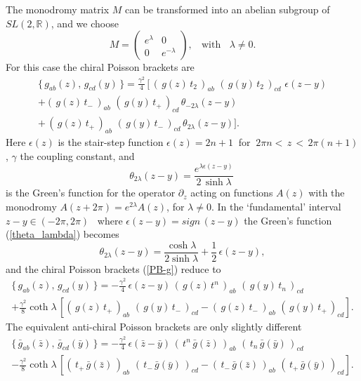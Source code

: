 \documentclass[a4paper,12pt]{article}
\newcommand{\rr}{\mathbb{R}}
\begin{document}
The monodromy matrix $M$ can be transformed into an abelian subgroup
\cite{Goddard}
of $SL(2,\rr)$, and we choose
\begin{equation}\label{monodromy-g1}
  M=\left( \begin{array}{cr}
  e^{\lambda} & 0\\ 0 & e^{-\lambda} \end{array}\right),
~~~~\mbox{with}~~~~\lambda \neq 0.
\end{equation}
For this case  the chiral
 Poisson brackets are \cite{JW}
\begin{eqnarray}\label{PB-lamda}
\label{PB-g}
\{\,g_{ab}(z),\, g_{cd}(y)\,\}=
\frac{\gamma^2}{4}\,[\,(\,g(z)\,t_2\,)_{ab}\,\,
(\,g(y)\,t_2\,)_{cd}\,\,\epsilon(z-y) \nonumber\\
+(\,g(z)\,t_-\,)_{ab}\,\,
(\,g(y)\,t_+\,)_{cd}\,
\theta_{-2\lambda} (z-y)\nonumber\\
+\, (\,g(z)\,t_+\,)_{ab}\,\,
(\,g(y)\,t_-\,)_{cd}\,
\theta_{2\lambda} (z-y)].
\end{eqnarray}
Here $\epsilon (z)$ is
the stair-step function $\epsilon (z)= 2n+1~$
for $~2\pi n <\,z\,<\, 2\pi (n+1)$,  $\gamma$  the coupling constant, and
\begin{equation}\label{theta_lambda}
\theta_{2\lambda} (z-y)=\frac{e^{\lambda \epsilon(z-y)}}{2\,\sinh\lambda}\,
\end{equation}
is the Green's function for the operator $\partial_z$ acting on
functions $A(z)$ with the monodromy $A(z+2\pi)=e^{2\lambda}A(z)$, for
$\lambda\neq 0$. In the
`fundamental' interval $z-y\in(-2\pi, 2\pi)$ \, where
$\epsilon(z-y)=sign\,(z-y)$ the Green's function (\ref{theta_lambda})
becomes
\begin{equation}\label{theta_lambda1}
\theta_{2\lambda} (z-y)=\frac{\cosh\lambda}{2\sinh\lambda}+
\frac{1}{2}\,\epsilon (z-y),
\end{equation}
and the chiral Poisson brackets (\ref{PB-g}) reduce to
\begin{eqnarray}\label{PB-g1}
\{\,g_{ab}(z),\, g_{cd}(y)\,\}=-
\frac{\gamma^2}{4}\,\epsilon(z-y)\,(\,g(z)\,t^n\,)_{ab}\,\,
(\,g(y)\,t_n\,)_{cd}\,~~~~~~~~~~\nonumber\\
+\frac{\gamma^2}{8}\coth\lambda\, [(\,g(z)\,t_+\,)_{ab}\,\,
(\,g(y)\,t_-\,)_{cd}-
 (\,g(z)\,t_-\,)_{ab}\,\,
(\,g(y)\,t_+\,)_{cd}].
\end{eqnarray}
The equivalent anti-chiral Poisson
brackets are only slightly different
\begin{eqnarray}\label{PB-g2}
\{\,\bar g_{ab}(\bar z),\, \bar g_{cd}(\bar y)\,\}=
-\frac{\gamma^2}{4}\,\epsilon(\bar z-\bar y)\,
(\,t^n\,\bar g(\bar z)\,)_{ab}\,\,
(\,t_n\,\bar g(\bar y)\,)_{cd}\, ~~~~~~~~~~\nonumber\\
-\frac{\gamma^2}{8}\coth\lambda\, [(\,t_+\,\bar g(\bar z)\,)_{ab}\,\,
(\,t_-\,\bar g(\bar y)\,)_{cd}-
 (\,t_-\,\bar g(\bar z)\,)_{ab}\,\,
(\,t_+\,\bar g(\bar y)\,)_{cd}].
\end{eqnarray}
\end{document}
